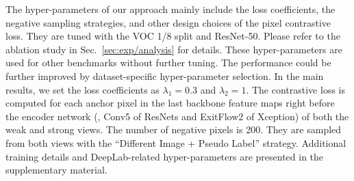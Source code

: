 The hyper-parameters of our approach mainly include the loss coefficients, the negative sampling strategies, and other design choices of the pixel contrastive loss. They are tuned with the VOC 1/8 split and ResNet-50. Please refer to the ablation study in Sec.~\ref{sec:exp/analysis} for details. These hyper-parameters are used for other benchmarks without further tuning. The performance could be further improved by dataset-specific hyper-parameter selection. In the main results, we set the loss coefficients as $\lambda_1=0.3$ and $\lambda_2=1$. The contrastive loss is computed for each anchor pixel in the last backbone feature maps right before the encoder network (\ie, Conv5 of ResNets and ExitFlow2 of Xception) of both the weak and strong views. The number of negative pixels is 200. They are sampled from both views with the ``Different Image + Pseudo Label'' strategy. Additional training details and DeepLab-related hyper-parameters are presented in the supplementary material.


